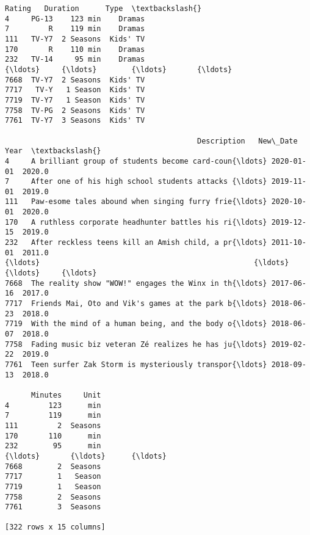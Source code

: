 \documentclass[11pt]{article}
\begin{document}
\begin{tcolorbox}[breakable, size=fbox, boxrule=.5pt, pad at break*=1mm, opacityfill=0]
\begin{Verbatim}[commandchars=\\\{\}]
     Rating   Duration      Type  \textbackslash{}
4     PG-13    123 min    Dramas
7         R    119 min    Dramas
111   TV-Y7  2 Seasons  Kids' TV
170       R    110 min    Dramas
232   TV-14     95 min    Dramas
{\ldots}     {\ldots}        {\ldots}       {\ldots}
7668  TV-Y7  2 Seasons  Kids' TV
7717   TV-Y   1 Season  Kids' TV
7719  TV-Y7   1 Season  Kids' TV
7758  TV-PG  2 Seasons  Kids' TV
7761  TV-Y7  3 Seasons  Kids' TV

                                            Description   New\_Date    Year  \textbackslash{}
4     A brilliant group of students become card-coun{\ldots} 2020-01-01  2020.0
7     After one of his high school students attacks {\ldots} 2019-11-01  2019.0
111   Paw-esome tales abound when singing furry frie{\ldots} 2020-10-01  2020.0
170   A ruthless corporate headhunter battles his ri{\ldots} 2019-12-15  2019.0
232   After reckless teens kill an Amish child, a pr{\ldots} 2011-10-01  2011.0
{\ldots}                                                 {\ldots}        {\ldots}     {\ldots}
7668  The reality show "WOW!" engages the Winx in th{\ldots} 2017-06-16  2017.0
7717  Friends Mai, Oto and Vik's games at the park b{\ldots} 2018-06-23  2018.0
7719  With the mind of a human being, and the body o{\ldots} 2018-06-07  2018.0
7758  Fading music biz veteran Zé realizes he has ju{\ldots} 2019-02-22  2019.0
7761  Teen surfer Zak Storm is mysteriously transpor{\ldots} 2018-09-13  2018.0

      Minutes     Unit
4         123      min
7         119      min
111         2  Seasons
170       110      min
232        95      min
{\ldots}       {\ldots}      {\ldots}
7668        2  Seasons
7717        1   Season
7719        1   Season
7758        2  Seasons
7761        3  Seasons

[322 rows x 15 columns]
\end{Verbatim}
\end{tcolorbox}
        

    
    
    
\end{document}
